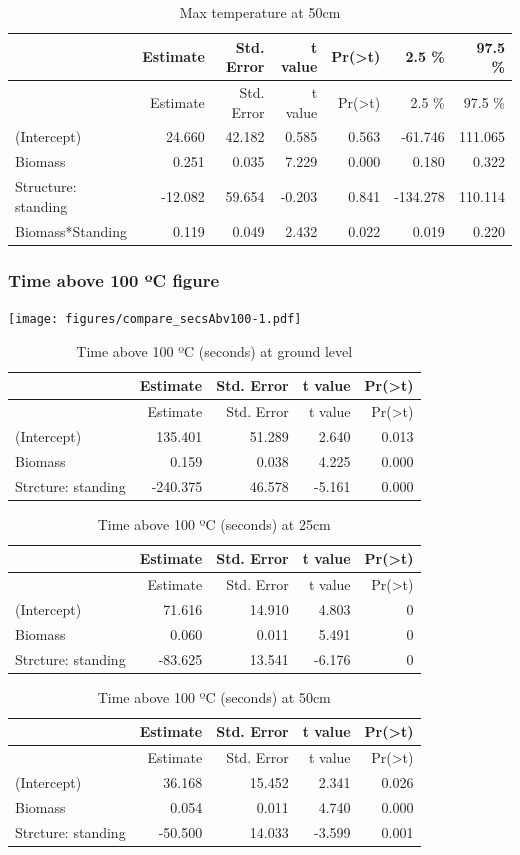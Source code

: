 \documentclass[11pt,a4paper]{article}
\begin{document}
\begin{longtable}[]{@{}lrrrrrr@{}}
\caption{Max temperature at 50cm}\tabularnewline
\toprule
& Estimate & Std. Error & t value &
Pr(\textgreater{}\textbar{}t\textbar{}) & 2.5 \% & 97.5
\%\tabularnewline
\midrule
\endfirsthead
\toprule
& Estimate & Std. Error & t value &
Pr(\textgreater{}\textbar{}t\textbar{}) & 2.5 \% & 97.5
\%\tabularnewline
\midrule
\endhead
(Intercept) & 24.660 & 42.182 & 0.585 & 0.563 & -61.746 &
111.065\tabularnewline
Biomass & 0.251 & 0.035 & 7.229 & 0.000 & 0.180 & 0.322\tabularnewline
Structure: standing & -12.082 & 59.654 & -0.203 & 0.841 & -134.278 &
110.114\tabularnewline
Biomass*Standing & 0.119 & 0.049 & 2.432 & 0.022 & 0.019 &
0.220\tabularnewline
\bottomrule
\end{longtable}

\hypertarget{time-above-100-c-figure}{%
\subsubsection{Time above 100 ºC figure}\label{time-above-100-c-figure}}

\texttt{[image: figures/compare\_secsAbv100-1.pdf]}

\begin{longtable}[]{@{}lrrrr@{}}
\caption{Time above 100 ºC (seconds) at ground level}\tabularnewline
\toprule
& Estimate & Std. Error & t value &
Pr(\textgreater{}\textbar{}t\textbar{})\tabularnewline
\midrule
\endfirsthead
\toprule
& Estimate & Std. Error & t value &
Pr(\textgreater{}\textbar{}t\textbar{})\tabularnewline
\midrule
\endhead
(Intercept) & 135.401 & 51.289 & 2.640 & 0.013\tabularnewline
Biomass & 0.159 & 0.038 & 4.225 & 0.000\tabularnewline
Strcture: standing & -240.375 & 46.578 & -5.161 & 0.000\tabularnewline
\bottomrule
\end{longtable}

\begin{longtable}[]{@{}lrrrr@{}}
\caption{Time above 100 ºC (seconds) at 25cm}\tabularnewline
\toprule
& Estimate & Std. Error & t value &
Pr(\textgreater{}\textbar{}t\textbar{})\tabularnewline
\midrule
\endfirsthead
\toprule
& Estimate & Std. Error & t value &
Pr(\textgreater{}\textbar{}t\textbar{})\tabularnewline
\midrule
\endhead
(Intercept) & 71.616 & 14.910 & 4.803 & 0\tabularnewline
Biomass & 0.060 & 0.011 & 5.491 & 0\tabularnewline
Strcture: standing & -83.625 & 13.541 & -6.176 & 0\tabularnewline
\bottomrule
\end{longtable}

\begin{longtable}[]{@{}lrrrr@{}}
\caption{Time above 100 ºC (seconds) at 50cm}\tabularnewline
\toprule
& Estimate & Std. Error & t value &
Pr(\textgreater{}\textbar{}t\textbar{})\tabularnewline
\midrule
\endfirsthead
\toprule
& Estimate & Std. Error & t value &
Pr(\textgreater{}\textbar{}t\textbar{})\tabularnewline
\midrule
\endhead
(Intercept) & 36.168 & 15.452 & 2.341 & 0.026\tabularnewline
Biomass & 0.054 & 0.011 & 4.740 & 0.000\tabularnewline
Strcture: standing & -50.500 & 14.033 & -3.599 & 0.001\tabularnewline
\bottomrule
\end{longtable}
\end{document}
